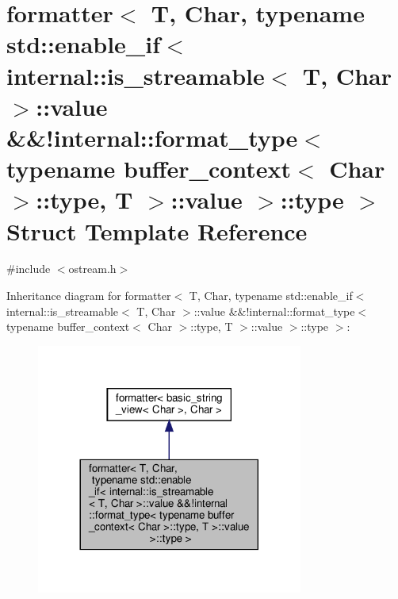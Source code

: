 \hypertarget{structformatter_3_01_t_00_01_char_00_01typename_01std_1_1enable__if_3_01internal_1_1is__streamabdfe791f5d6e0a8acd43f884d0761b8af}{}\section{formatter$<$ T, Char, typename std\+:\+:enable\+\_\+if$<$ internal\+:\+:is\+\_\+streamable$<$ T, Char $>$\+:\+:value \&\&!internal\+:\+:format\+\_\+type$<$ typename buffer\+\_\+context$<$ Char $>$\+:\+:type, T $>$\+:\+:value $>$\+:\+:type $>$ Struct Template Reference}
\label{structformatter_3_01_t_00_01_char_00_01typename_01std_1_1enable__if_3_01internal_1_1is__streamabdfe791f5d6e0a8acd43f884d0761b8af}


{\ttfamily \#include $<$ostream.\+h$>$}



Inheritance diagram for formatter$<$ T, Char, typename std\+:\+:enable\+\_\+if$<$ internal\+:\+:is\+\_\+streamable$<$ T, Char $>$\+:\+:value \&\&!internal\+:\+:format\+\_\+type$<$ typename buffer\+\_\+context$<$ Char $>$\+:\+:type, T $>$\+:\+:value $>$\+:\+:type $>$\+:
\nopagebreak
\begin{figure}[H]
\begin{center}
\leavevmode
\includegraphics[width=248pt]{structformatter_3_01_t_00_01_char_00_01typename_01std_1_1enable__if_3_01internal_1_1is__streamab885d53853f9ad846b8594806c35df87e}
\end{center}
\end{figure}


